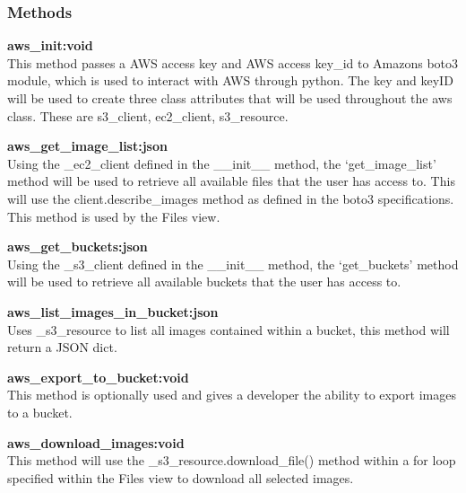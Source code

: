 \subsubsection{Methods}
\textbf{aws\_init:void} \\
    This method passes a AWS access key and AWS access key\_id to Amazons boto3 module, which is used to interact with AWS through python. The key 
    and keyID will be used to create three class attributes that will be used throughout the aws class. These are s3\_client, ec2\_client, s3\_resource.
    
\textbf{aws\_get\_image\_list:json} \\
    Using the \_ec2\_client defined in the __init__ method, the `get\_image\_list' method will be used to retrieve all available files that the user 
    has access to. This will use the client.describe\_images method as defined in the boto3 specifications. This method is used by the Files view.

\textbf{aws\_get\_buckets:json} \\
    Using the \_s3\_client defined in the __init__  method, the `get\_buckets' method will be used to retrieve all available buckets that the user 
    has access to.

\textbf{aws\_list\_images\_in\_bucket:json} \\
    Uses \_s3\_resource to list all images contained within a bucket, this method will return a JSON dict.

\textbf{aws\_export\_to\_bucket:void} \\
    This method is optionally used and gives a developer the ability to export images to a bucket.

\textbf{aws\_download\_images:void} \\
    This method will use the \_s3\_resource.download\_file() method within a for loop specified within the Files view to download all selected images.

